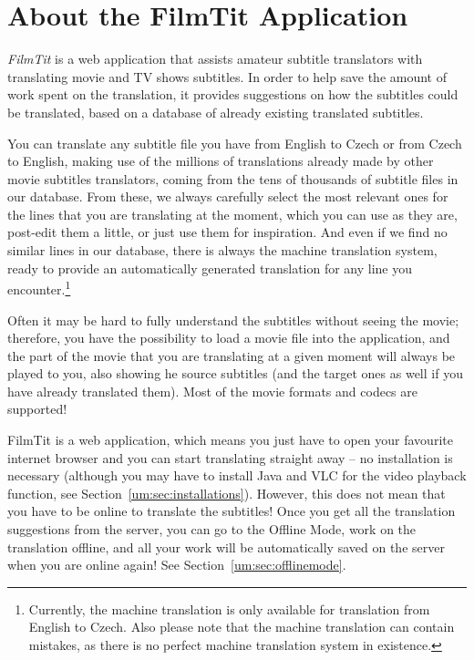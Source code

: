 \label{chap:users_manual}

\section{About the FilmTit Application}

\emph{FilmTit} is a web application that assists amateur subtitle translators with translating movie and TV shows subtitles. In order to help save the amount of work spent on the translation, it provides suggestions on how the subtitles could be translated, based on a database of already existing translated subtitles.

You can translate any subtitle file you have from English to Czech or from Czech to English, making use of the millions of translations already made by other movie subtitles translators, coming from the tens of thousands of subtitle files in our database. From these, we always carefully select the most relevant ones for the lines that you are translating at the moment, which you can use as they are, post-edit them a little, or just use them for inspiration. And even if we find no similar lines in our database, there is always the machine translation system, ready to provide an automatically generated translation for any line you encounter.\footnote{Currently, the machine translation is only available for translation from English to Czech. Also please note that the machine translation can contain mistakes, as there is no perfect machine translation system in existence.}

Often it may be hard to fully understand the subtitles without seeing the movie; therefore, you have the possibility to load a movie file into the application, and the part of the movie that you are translating at a given moment will  always be played to you, also showing he source subtitles (and the target ones as well if you have already translated them). Most of the movie formats and codecs are supported!

FilmTit is a web application, which means you just have to open your favourite internet browser and you can start translating straight away -- no installation is necessary (although you may have to install Java and VLC for the video playback function, see Section~\ref{um:sec:installations}). However, this does not mean that you have to be online to translate the subtitles! Once you get all the translation suggestions from the server, you can go to the Offline Mode, work on the translation offline, and all your work will be automatically saved on the server when you are online again! See Section~\ref{um:sec:offlinemode}.

